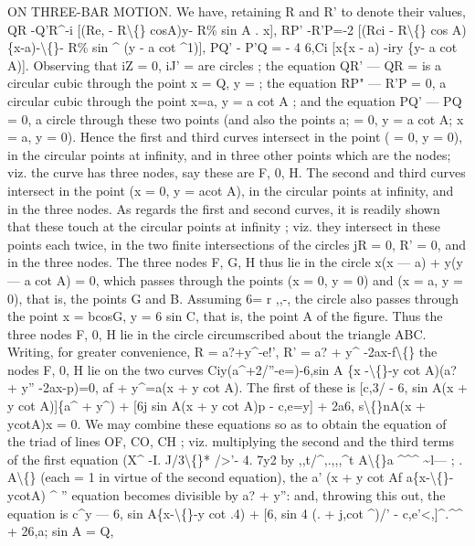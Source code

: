 \documentclass[11pt,a4paper]{book}
\begin{document}
ON THREE-BAR MOTION.
We
have, retaining R and R'
to denote
their
values,
QR -Q'R\textasciicircum{}-i [(Re, - R\textbackslash\{\} cosA)y- R\% sin A
. x],
RP' -R'P=-2 [(Rci - R\textbackslash\{\} cos A) \{x-a)-\textbackslash\{\}- R\% sin \textasciicircum{} (y - a cot \textasciicircum{}1)],
PQ' - P'Q = - 4 6,Ci [x\{x - a) -iry \{y- a cot A)].
Observing
that
iZ = 0,
iJ' =
are
circles
;
the
equation QR' --- QR =
is a circular
cubic
through
the
point
x = Q,
y =
;
the
equation RP" --- R'P = 0,
a
circular
cubic
through
the
point x=a,
y = a cot A
;
and
the
equation PQ' --- PQ = 0, a
circle
through
these
two
points
(and
also
the
points
a; = 0,
y = a cot A;
x = a,
y = 0).
Hence
the
first
and
third
curves
intersect
in
the
point
(\guillemotleft{} = 0,
y = 0),
in
the
circular
points
at
infinity, and
in three other points which
are the nodes;
viz.
the
curve
has
three
nodes,
say
these
are
F,
0,
H.
The
second
and
third
curves
intersect
in
the
point
(x = 0,
y = acot A),
in the
circular points
at
infinity, and
in the
three
nodes.
As
regards
the
first
and second
curves,
it
is
readily shown
that
these
touch
at
the
circular
points
at
infinity
;
viz.
they
intersect
in
these
points each
twice,
in the two
finite
intersections
of
the
circles
jR = 0, R' = 0, and
in the three
nodes.
The three nodes F,
G, H thus
lie in the
circle
x(x --- a) + y(y --- a cot A) = 0,
which
passes
through
the
points
(x = 0,
y = 0)
and
(x = a,
y = 0),
that
is,
the
points
G and
B.
Assuming 6=
r
,,-,
the
circle
also
passes
through
the
point x = bcosG,
y = 6 sin C,
that
is,
the
point A
of the
figure.
Thus
the
three
nodes F,
0, H
lie
in
the
circle circumscribed about the triangle ABC.
Writing,
for greater convenience,
R = a?+y\textasciicircum{}-e!', R' = a? + y\textasciicircum{} -2ax-f\textbackslash\{\}
the nodes F, 0, H
lie on the two curves
Ciy(a\textasciicircum{}+2/''-e=)-6,sin A \{x -\textbackslash\{\}-y cot A)(a? + y'' -2ax-p)=0,
af + y\textasciicircum{}=a(x + y cot A).
The
first of these
is
[c,3/ - 6, sin A(x + y cot A)]\{a\textasciicircum{} + y\textasciicircum{})
+ [6j sin A(x + y cot A)p - c,e=y]
+ 2a6, s\textbackslash\{\}nA(x + ycotA)x = 0.
We may
combine
these
equations
so
as
to
obtain
the
equation
of
the
triad
of
lines OF, CO, CH
;
viz. multiplying the second and
the
third
terms
of the
first
equation
(X\textasciicircum{} -I. \textbullet{}J/3\textbackslash\{\}*
/\guillemotright{}>'- 4. 7y2
by
,,t/\textasciicircum{},.,,,\textasciicircum{}t
A\textbackslash\{\}a
\textasciicircum{}\textasciicircum{}\textasciicircum{}
\textasciitilde{}l---
;
.
A\textbackslash\{\}
(each = 1
in
virtue of
the second
equation), the
a' (x + y cot Af
a\{x-\textbackslash\{\}-ycotA)
\textasciicircum{}
''
equation becomes
divisible by
a? + y'':
and, throwing
this out, the equation
is
c\textasciicircum{}y --- 6, sin A\{x-\textbackslash\{\}-y cot .4)
+ [6, sin 4 (. + j,cot \textasciicircum{})/' - c,e'<,]\textasciicircum{}.\textasciicircum{}\textasciicircum{}
+ 26,a; sin A = Q,
\end{document}
